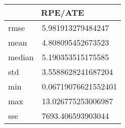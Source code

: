 \begin{table}[!ht] 
 \centering 
 \begin{tabular}{|l|l|} \hline 
 \multicolumn{2}{|c|}{RPE/ATE} \\ \hline 
 rmse & 5.981913279484247 \\ \hline 
mean & 4.808095452673523 \\ \hline 
median & 5.190353515175585 \\ \hline 
std & 3.5588628241687204 \\ \hline 
min & 0.06719076621552401 \\ \hline 
max & 13.026775253006987 \\ \hline 
sse & 7693.406593903044 \\ \hline 
\end{tabular} 
 \end{table}